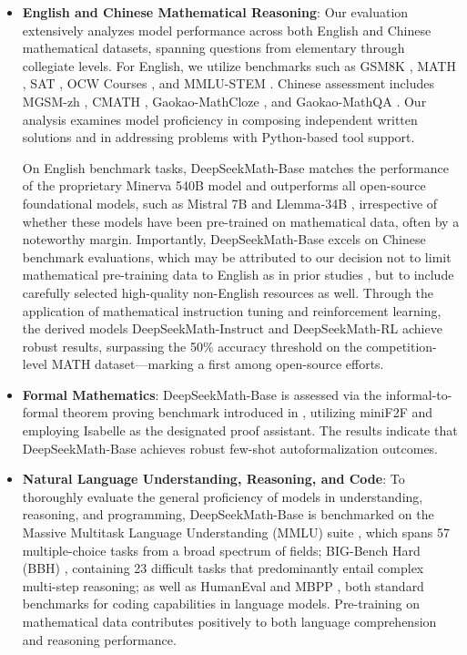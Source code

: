 \begin{itemize}[topsep=0pt]
    \item \textbf{English and Chinese Mathematical Reasoning}: Our evaluation extensively analyzes model performance across both English and Chinese mathematical datasets, spanning questions from elementary through collegiate levels. For English, we utilize benchmarks such as GSM8K \citep{gsm8k}, MATH \citep{MATH}, SAT \citep{llemma}, OCW Courses \citep{minerva}, and MMLU-STEM \citep{mmlu}. Chinese assessment includes MGSM-zh \citep{mgsm}, CMATH \citep{wei2023cmath}, Gaokao-MathCloze \citep{agieval}, and Gaokao-MathQA \citep{agieval}. Our analysis examines model proficiency in composing independent written solutions and in addressing problems with Python-based tool support.

On English benchmark tasks, DeepSeekMath-Base matches the performance of the proprietary Minerva 540B model \citep{minerva} and outperforms all open-source foundational models, such as Mistral 7B \citep{mistral} and Llemma-34B \citep{llemma}, irrespective of whether these models have been pre-trained on mathematical data, often by a noteworthy margin. Importantly, DeepSeekMath-Base excels on Chinese benchmark evaluations, which may be attributed to our decision not to limit mathematical pre-training data to English as in prior studies \citep{minerva,llemma}, but to include carefully selected high-quality non-English resources as well. Through the application of mathematical instruction tuning and reinforcement learning, the derived models DeepSeekMath-Instruct and DeepSeekMath-RL achieve robust results, surpassing the 50\% accuracy threshold on the competition-level MATH dataset—marking a first among open-source efforts.

\item \textbf{Formal Mathematics}: DeepSeekMath-Base is assessed via the informal-to-formal theorem proving benchmark introduced in \citep{dsp_proof}, utilizing miniF2F \citep{minif2f} and employing Isabelle \citep{isabelle} as the designated proof assistant. The results indicate that DeepSeekMath-Base achieves robust few-shot autoformalization outcomes.
\item \textbf{Natural Language Understanding, Reasoning, and Code}: To thoroughly evaluate the general proficiency of models in understanding, reasoning, and programming, DeepSeekMath-Base is benchmarked on the Massive Multitask Language Understanding (MMLU) suite \citep{mmlu}, which spans 57 multiple-choice tasks from a broad spectrum of fields; BIG-Bench Hard (BBH) \citep{bbh}, containing 23 difficult tasks that predominantly entail complex multi-step reasoning; as well as HumanEval \citep{codex} and MBPP \citep{mbpp}, both standard benchmarks for coding capabilities in language models. Pre-training on mathematical data contributes positively to both language comprehension and reasoning performance.


\end{itemize}
